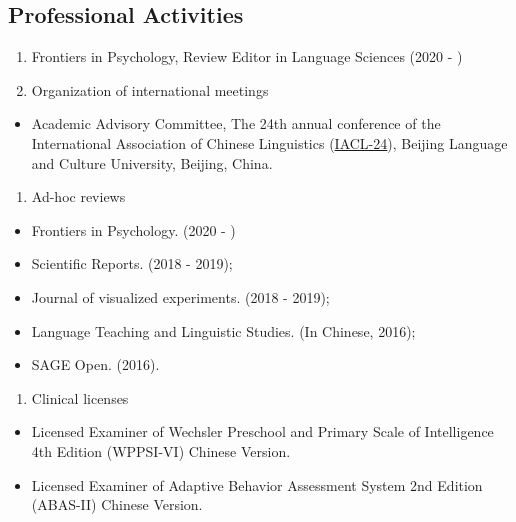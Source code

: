 \documentclass[
  12pt,
]{article}
\providecommand{\tightlist}{%
  \setlength{\itemsep}{0pt}\setlength{\parskip}{0pt}}
\begin{document}
\hypertarget{professional-activities}{%
\subsection{Professional Activities}\label{professional-activities}}

\begin{enumerate}
\def\labelenumi{\arabic{enumi}.}
\item
  Frontiers in Psychology, Review Editor in Language Sciences (2020 - )
\item
  Organization of international meetings
\end{enumerate}

\begin{itemize}
\tightlist
\item
  Academic Advisory Committee, The 24th annual conference of the
  International Association of Chinese Linguistics
  (\href{http://iacl24.blcu.edu.cn}{IACL-24}), Beijing Language and
  Culture University, Beijing, China.
\end{itemize}

\begin{enumerate}
\def\labelenumi{\arabic{enumi}.}
\setcounter{enumi}{2}
\tightlist
\item
  Ad-hoc reviews
\end{enumerate}

\begin{itemize}
\tightlist
\item
  Frontiers in Psychology. (2020 - )
\item
  Scientific Reports. (2018 - 2019);
\item
  Journal of visualized experiments. (2018 - 2019);
\item
  Language Teaching and Linguistic Studies. (In Chinese, 2016);
\item
  SAGE Open. (2016).
\end{itemize}

\begin{enumerate}
\def\labelenumi{\arabic{enumi}.}
\setcounter{enumi}{3}
\tightlist
\item
  Clinical licenses
\end{enumerate}

\begin{itemize}
\item
  Licensed Examiner of Wechsler Preschool and Primary Scale of
  Intelligence 4th Edition (WPPSI-VI) Chinese Version.
\item
  Licensed Examiner of Adaptive Behavior Assessment System 2nd Edition
  (ABAS-II) Chinese Version.
\end{itemize}
\end{document}
